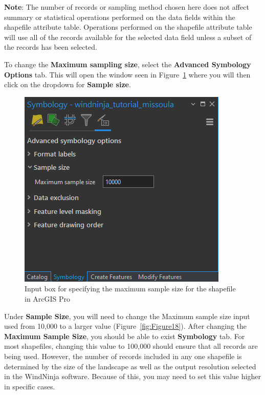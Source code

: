 \documentclass[12pt]{article}
\begin{document}
\textbf{Note}: The number of records or sampling method chosen here does not affect summary or statistical operations performed on the data fields within the shapefile attribute table. Operations performed on the shapefile attribute table will use all of the records available for the selected data field unless a subset of the records has been selected. 

To change the \textbf{Maximum sampling size}, select the \textbf{Advanced Symbology Options} tab. This will open the window seen in Figure~\ref{fig:Figure19} where you will then click on the dropdown for \textbf{Sample size}. 

\begin{figure}[H]
	\centering
	\includegraphics[scale=0.45]{arc_19.png}
	\caption{Input box for specifying the maximum sample size for the shapefile in ArcGIS Pro}
\label{fig:Figure19}
\end{figure}

Under \textbf{Sample Size}, you will need to change the Maximum sample size input used from 10,000 to a larger value (Figure~\ref{fig:Figure18}). After changing the \textbf{Maximum Sample Size}, you should be able to exist \textbf{Symbology} tab. For most shapefiles, changing this value to 100,000 should ensure that all records are being used. However, the number of records included in any one shapefile is determined by the size of the landscape as well as the output resolution selected in the WindNinja software. Because of this, you may need to set this value higher in specific cases.

\pagebreak
\end{document}
